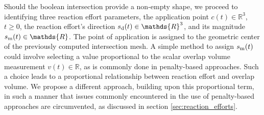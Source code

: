Should the boolean intersection provide a non-empty shape, we proceed to identifying three reaction effort parameters, the application point $c(t) \in \mathds{R}^3$, $t\geqslant 0$, the reaction effort's direction $s_{\text d}(t)\in \mathds{R}^3 $, and its magnitude $s_{\rm m}(t)\in \mathds{R}$. The point of application is assigned to the geometric center of the previously computed intersection mesh. A simple method to assign $s_{\rm m}(t)$ could involve selecting a value proportional to the scalar overlap volume measurement $v(t) \in \mathds{R}$, as is commonly done in penalty-based approaches. Such a choice leads to a proportional relationship between reaction effort and overlap volume. We propose a different approach, building upon this proportional term, in such a manner that issues commonly encountered in the use of penalty-based approaches are circumvented, as discussed in section \ref{sec:reaction_efforts}.

